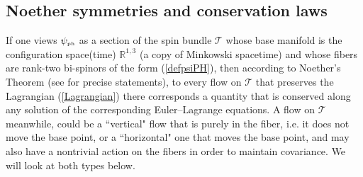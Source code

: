 \documentclass[11pt]{article}
\theoremstyle{definition}
\newcommand{\refeq}[1]{(\ref{#1})}
\numberwithin{equation}{section}
\newcommand{\cT}{\mathcal{T}}
\newcommand{\psiPH}{{\psi_{\mbox{\rm\tiny ph}}}}
\newcommand{\Rset}{{\mathbb R}}
\begin{document}
\subsection{Noether symmetries and conservation laws}
 If one views $\psiPH$ as a section of the spin bundle $\cT$ whose base manifold is the configuration space(time) $\Rset^{1,3}$ (a copy 
of Minkowski spacetime) and whose fibers are rank-two bi-spinors of the form \refeq{defpsiPH}, then according to Noether\rq{}s 
Theorem \cite{Noe1918}  (see \cite{Chr2000} for precise statements), to every flow on $\cT$ that preserves the Lagrangian \refeq{Lagrangian} 
there corresponds a quantity that is conserved along any solution of the corresponding Euler--Lagrange equations. 
 A flow on $\cT$ meanwhile, could be a ``vertical" flow that is purely in the fiber, i.e. it does not move the base point, or a ``horizontal" one 
that moves the base point, and may also  have a nontrivial action on the fibers in order to maintain covariance. 
  We will look at both types below.

\end{document}
